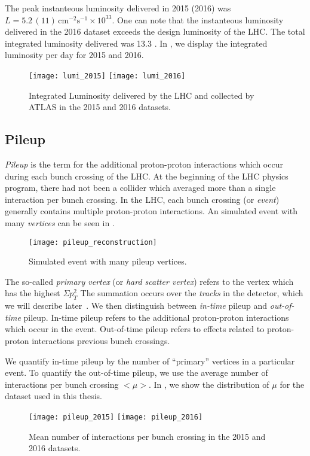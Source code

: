 The peak instanteous luminosity delivered in 2015 (2016) was $L = 5.2 \, (11) \, \text{cm}^{-2} \text{s}^{-1} \times 10^{33} $.
One can note that the instanteous luminosity delivered in the 2016 dataset exceeds the design luminosity of the LHC.
The total integrated luminosity delivered was 13.3 \ifb.
In , we display the integrated luminosity per day for 2015 and 2016.
\begin{figure}
\caption{Integrated Luminosity delivered by the LHC and collected by ATLAS in the 2015 and 2016 datasets.}\label{fig:lumi}
\texttt{[image: lumi\_2015]}
\texttt{[image: lumi\_2016]}
\end{figure}

\subsection{Pileup}

\textit{Pileup} is the term for the additional proton-proton interactions which occur during each bunch crossing of the LHC.
At the beginning of the LHC physics program, there had not been a collider which averaged more than a single interaction per bunch crossing.
In the LHC, each bunch crossing (or \textit{event})  generally contains multiple proton-proton interactions.
An simulated event with many \textit{vertices} can be seen in .
\begin{figure}
\caption{Simulated event with many pileup vertices.}\label{fig:pileup_reconstruction}
\texttt{[image: pileup\_reconstruction]}
\end{figure}
The so-called \textit{primary vertex} (or \textit{hard scatter vertex}) refers to the vertex which has the highest $\Sigma p_T^2$
The summation occurs over the \textit{tracks} in the detector, which we will describe later~\cite{ATL-INDET-PUB-2009-001}.
We then distinguish between \textit{in-time} pileup and \textit{out-of-time} pileup.
In-time pileup refers to the additional proton-proton interactions which occur in the event.
Out-of-time pileup refers to effects related to proton-proton interactions previous bunch crossings.

We quantify in-time pileup by the number of ``primary''\footnotemark \xspace vertices in a particular event.
To quantify the out-of-time pileup, we use the average number of interactions per bunch crossing $<\mu>$.
In , we show the distribution of $\mu$ for the dataset used in this thesis.
\begin{figure}
\caption{Mean number of interactions per bunch crossing in the 2015 and 2016 datasets.}\label{fig:pileup}
\texttt{[image: pileup\_2015]}
\texttt{[image: pileup\_2016]}
\end{figure}